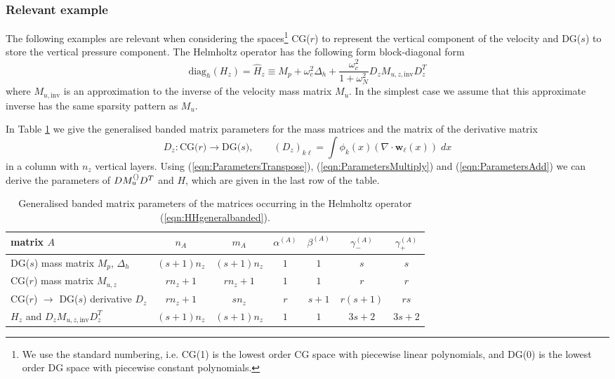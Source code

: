 \documentclass[10pt]{article}
\renewcommand{\vec}[1]{\boldsymbol{#1}}
\begin{document}
\subsubsection{Relevant example}
The following examples are relevant when considering the spaces\footnote{We use the standard numbering, i.e. CG(1) is the lowest order CG space with piecewise linear polynomials, and DG(0) is the lowest order DG space with piecewise constant polynomials.} CG($r$) to represent the vertical component of the velocity and DG($s$) to store the vertical pressure component. The Helmholtz operator has the following form block-diagonal form
\begin{equation}
  \text{diag}_h(H_z) = \hat{H}_z \equiv M_{p} + \omega_c^2\Delta_h+\frac{\omega_c^2}{1+\omega_N^2} D_z M_{u,z,\text{inv}} D_z^T
  \label{eqn:HHgeneralbanded}
\end{equation}
where $M_{u,\text{inv}}$ is an approximation to the inverse of the velocity mass matrix $M_u$. In the simplest case we assume that this approximate inverse has the same sparsity pattern as $M_u$.

In Table \ref{tab:Matrixparameters} we give the generalised banded matrix parameters for the mass matrices and the matrix of the derivative matrix
\begin{equation}
  D_z:\text{CG($r$)}\rightarrow \text{DG($s$)}, \qquad
  \left(D_z\right)_{k\ell} = \int \phi_k(x)(\nabla\cdot \vec{w}_\ell(x))\;dx
\end{equation}
in a column with $n_z$ vertical layers. Using (\ref{eqn:ParametersTranspose}), (\ref{eqn:ParametersMultiply}) and (\ref{eqn:ParametersAdd}) we can derive the parameters of $DM_u^{(\text)}D^T$ and $H$, which are given in the last row of the table.
\begin{table}
 \begin{center}
 \begin{tabular}{lcccccc}
  \hline
   matrix $A$ & $n_A$ & $m_A$ & $\alpha^{(A)}$ & $\beta^{(A)}$ & $\gamma_-^{(A)}$ & $\gamma_+^{(A)}$\\
   \hline\hline
   DG($s$) mass matrix $M_{p}$, $\Delta_h$ & $(s+1)n_z$ & $(s+1)n_z$ & $1$ & $1$ & $s$ & $s$\\
   CG($r$) mass matrix $M_{u,z}$ & $rn_z+1$ & $rn_z+1$ & $1$ & $1$ & $r$ & $r$\\
   CG($r$) $\rightarrow$ DG($s$) derivative $D_z$ & $rn_z+1$ & $sn_z$ & $r$ & $s+1$ & $r(s+1)$ & $rs$\\
   $H_z$ and $D_zM_{u,z,\text{inv}}D_z^T$ & $(s+1)n_z$ & $(s+1)n_z$ & $1$ & $1$ & $3s+2$ & $3s+2$\\
  \hline
 \end{tabular}
 \end{center}
 \caption{Generalised banded matrix parameters of the matrices occurring in the Helmholtz operator (\ref{eqn:HHgeneralbanded}).}
 \label{tab:Matrixparameters}
\end{table}
\end{document}

